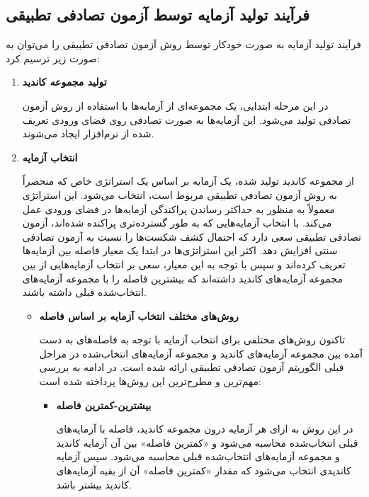 \subsection{فرآیند تولید آزمایه توسط آزمون تصادفی تطبیقی}

فرآیند تولید آزمایه به صورت خودکار توسط روش آزمون تصادفی تطبیقی را می‌توان به صورت زیر ترسیم کرد:
\begin{enumerate}
	\item \textbf{تولید مجموعه کاندید}
	
	 در این مرحله ابتدایی، یک مجموعه‌ای از آزمایه‌ها با استفاده از روش آزمون تصادفی تولید می‌شود. این آزمایه‌ها به صورت تصادفی روی فضای ورودی تعریف شده از نرم‌افزار ایجاد می‌شوند.
	 
	\item \textbf{انتخاب آزمایه}
	
	 از مجموعه کاندید تولید شده، یک آزمایه بر اساس یک استراتژی خاص که منحصراً به روش آزمون تصادفی تطبیقی مربوط است، انتخاب می‌شود. این استراتژی معمولاً به منظور به حداکثر رساندن پراکندگی آزمایه‌ها در فضای ورودی عمل می‌کند. با انتخاب آزمایه‌هایی که به طور گسترده‌تری پراکنده شده‌اند، آزمون تصادفی تطبیقی سعی دارد که احتمال کشف شکست‌ها را نسبت به آزمون تصادفی سنتی افزایش دهد. اکثر این استراتژی‌ها در ابتدا یک معیار فاصله بین آزمایه‌ها تعریف کرده‌اند و سپس با توجه به این معیار، سعی بر انتخاب آزمایه‌هایی از بین مجموعه آزمایه‌های کاندید داشته‌اند که بیشترین فاصله را با مجموعه آزمایه‌های انتخاب‌شده قبلی داشته باشند.
	 
	\begin{itemize}
		\item \textbf{روش‌های مختلف انتخاب آزمایه بر اساس فاصله}
		
		تاکنون روش‌های مختلفی برای انتخاب آزمایه با توجه به فاصله‌های به دست آمده بین مجموعه آزمایه‌های کاندید و مجموعه آزمایه‌های انتخاب‌شده در مراحل قبلی الگوریتم آزمون تصادفی تطبیقی ارائه شده است. در ادامه به بررسی مهم‌ترین و مطرح‌ترین این روش‌ها پرداخته شده است:
		
		\begin{itemize}
			\item \textbf{بیشترین-کمترین فاصله}
			 
			در این روش \cite{chen2001proportional} به ازای هر آزمایه درون مجموعه کاندید، فاصله با آزمایه‌های قبلی انتخاب‌شده محاسبه می‌شود و «کمترین فاصله» بین آن آزمایه کاندید و مجموعه آزمایه‌های انتخاب‌شده قبلی محاسبه می‌شود. سپس آزمایه‌ کاندیدی انتخاب می‌شود که مقدار «کمترین فاصله» آن از بقیه آزمایه‌های کاندید بیشتر باشد.
			

\end{itemize}
\end{itemize}
\end{enumerate}
